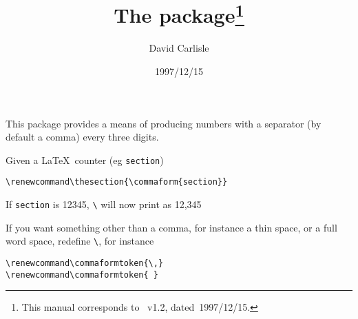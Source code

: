 \documentclass[DIV=9, fontsize=14pt, parskip=full, pagesize=auto]{scrartcl}
\title{The \pkg{comma} package\thanks{This manual corresponds to \pkg{comma}~v1.2, dated~1997/12/15.}}
\author{David Carlisle}
\date{1997/12/15}
\makeatletter
\newcommand*{\cs}[1]{\texttt{\textbackslash#1}}
\newcommand*{\cmd}[1]{\cs{\expandafter\@gobble\string#1}}
\makeatother
\begin{document}
\maketitle

This package provides a means of producing numbers with a separator
(by default a comma) every three digits.

Given a \LaTeX\ counter (eg \texttt{section})
%
\begin{verbatim}
\renewcommand\thesection{\commaform{section}}
\end{verbatim}
%
If \texttt{section} is 12345, \cmd{\thesection} will now print as 12,345

If you want something other than a comma, for instance a thin
space, or a full word space, redefine \cmd{\commaformtoken}, for instance
%
\begin{verbatim}
\renewcommand\commaformtoken{\,}
\renewcommand\commaformtoken{ }
\end{verbatim}
\end{document}
